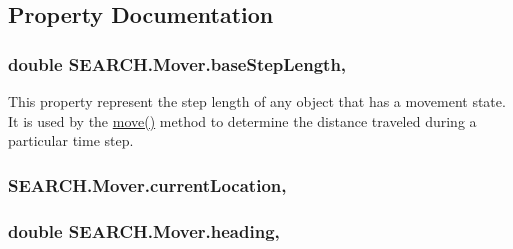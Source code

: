 \subsection{Property Documentation}
\hypertarget{class_s_e_a_r_c_h_1_1_mover_aee1e8a76587d4b51e7db5b475b86ac97}{
\subsubsection[{base\-Step\-Length}]{\setlength{\rightskip}{0pt plus 5cm}double S\-E\-A\-R\-C\-H.\-Mover.\-base\-Step\-Length\hspace{0.3cm}{\ttfamily [get]}, {\ttfamily [set]}}}\label{class_s_e_a_r_c_h_1_1_mover_aee1e8a76587d4b51e7db5b475b86ac97}


This property represent the step length of any object that has a movement state. It is used by the \hyperlink{class_s_e_a_r_c_h_1_1_mover_ab2dfc659f3817ea48d66ff4d7e464d1d}{move()} method to determine the distance traveled during a particular time step. 

\hypertarget{class_s_e_a_r_c_h_1_1_mover_adbd8f2d23d7a01350e2d598b15a0447d}{
\subsubsection[{current\-Location}]{ S\-E\-A\-R\-C\-H.\-Mover.\-current\-Location\hspace{0.3cm}{\ttfamily [get]}, {\ttfamily [set]}}}\label{class_s_e_a_r_c_h_1_1_mover_adbd8f2d23d7a01350e2d598b15a0447d}
\hypertarget{class_s_e_a_r_c_h_1_1_mover_a460b88ef4c0b1be0b4dfb20bb7d8cc6c}{
\subsubsection[{heading}]{\setlength{\rightskip}{0pt plus 5cm}double S\-E\-A\-R\-C\-H.\-Mover.\-heading\hspace{0.3cm}{\ttfamily [get]}, {\ttfamily [set]}}}\label{class_s_e_a_r_c_h_1_1_mover_a460b88ef4c0b1be0b4dfb20bb7d8cc6c}



